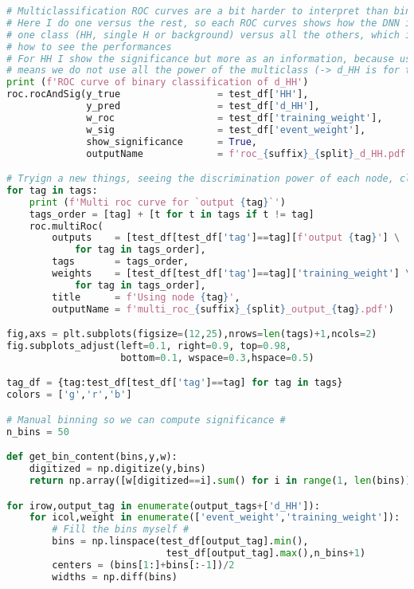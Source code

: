 \begin{lstlisting}[language=Python, caption=Python module of the analysis used in Bamboo framework, label={dnncode}]
# Multiclassification ROC curves are a bit harder to interpret than binary classification
# Here I do one versus the rest, so each ROC curves shows how the DNN is able to classify
# one class (HH, single H or background) versus all the others, which is one projection on
# how to see the performances
# For HH I show the significance but more as an information, because using only the HH node 
# means we do not use all the power of the multiclass (-> d_HH is for that)
print (f'ROC curve of binary classification of d_HH')
roc.rocAndSig(y_true                 = test_df['HH'],
              y_pred                 = test_df['d_HH'],
              w_roc                  = test_df['training_weight'],
              w_sig                  = test_df['event_weight'],
              show_significance      = True,
              outputName             = f'roc_{suffix}_{split}_d_HH.pdf')

# Tryign a new things, seeing the discrimination power of each node, class wise
for tag in tags:
    print (f'Multi roc curve for `output {tag}`')
    tags_order = [tag] + [t for t in tags if t != tag]
    roc.multiRoc(
        outputs    = [test_df[test_df['tag']==tag][f'output {tag}'] \
            for tag in tags_order],
        tags       = tags_order,
        weights    = [test_df[test_df['tag']==tag]['training_weight'] \
            for tag in tags_order],
        title      = f'Using node {tag}',
        outputName = f'multi_roc_{suffix}_{split}_output_{tag}.pdf')

fig,axs = plt.subplots(figsize=(12,25),nrows=len(tags)+1,ncols=2)
fig.subplots_adjust(left=0.1, right=0.9, top=0.98,
                    bottom=0.1, wspace=0.3,hspace=0.5)

tag_df = {tag:test_df[test_df['tag']==tag] for tag in tags}
colors = ['g','r','b']

# Manual binning so we can compute significance #
n_bins = 50

def get_bin_content(bins,y,w):
    digitized = np.digitize(y,bins)
    return np.array([w[digitized==i].sum() for i in range(1, len(bins))])

for irow,output_tag in enumerate(output_tags+['d_HH']):
    for icol,weight in enumerate(['event_weight','training_weight']):
        # Fill the bins myself #
        bins = np.linspace(test_df[output_tag].min(),
                            test_df[output_tag].max(),n_bins+1)
        centers = (bins[1:]+bins[:-1])/2
        widths = np.diff(bins)
        

\end{lstlisting}
